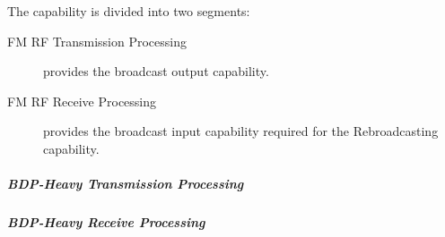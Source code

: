 The \ThisSegment \FM capability is divided into two segments:
\begin{description}
	\item[FM RF Transmission Processing] provides the \FM broadcast output capability.%
	\item[FM RF Receive Processing]  provides the \FM broadcast input  capability required for the Rebroadcasting capability.%
\end{description}

\subparagraph{BDP-Heavy \FM \RF Transmission Processing}
\label{loc:Heavy_RF_FM_Transmission}
\renewcommand{\ThisSubSegment}{BDP-Heavy FM RF\xspace}%


\subparagraph{BDP-Heavy \FM \RF Receive Processing}
\label{loc:Heavy_RF_FM_Receive}
\renewcommand{\ThisSubSegment}{BDP-Heavy FM RF\xspace}%

